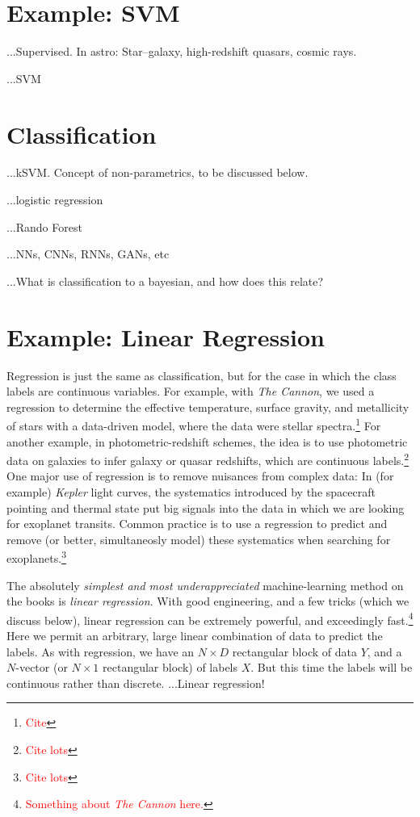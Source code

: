 \documentclass[12pt, twoside, letterpaper]{article}
\newcommand{\project}[1]{\textsl{#1}}
\newcommand{\todo}[1]{\textcolor{red}{#1}}  %
\begin{document}
\section{Example: SVM}

...Supervised. In astro: Star--galaxy, high-redshift quasars, cosmic rays.

...SVM

\section{Classification}

...kSVM. Concept of non-parametrics, to be discussed below.

...logistic regression

...Rando Forest

...NNs, CNNs, RNNs, GANs, etc

...What is classification to a bayesian, and how does this relate?

\section{Example: Linear Regression}

Regression is just the same as classification, but for the case
in which the class labels are continuous variables.
For example, with \project{The Cannon}, we used a regression
to determine the effective temperature, surface gravity, and
metallicity of stars with a data-driven model, where the data
were stellar spectra.\footnote{\todo{Cite}}
For another example, in photometric-redshift schemes, the idea
is to use photometric data on galaxies to infer galaxy or
quasar redshifts,
which are continuous labels.\footnote{\todo{Cite lots}}
One major use of regression is to remove nuisances from complex
data:
In (for example) \project{Kepler} light curves, the systematics
introduced by the spacecraft pointing and thermal state put
big signals into the data in which we are looking for exoplanet
transits.
Common practice is to use a regression to predict and remove
(or better, simultaneosly model) these systematics when searching
for exoplanets.\footnote{\todo{Cite lots}}

The absolutely \emph{simplest and most underappreciated} machine-learning
method on the books is \emph{linear regression}.
With good engineering, and a few tricks (which we discuss below), linear
regression can be extremely powerful, and exceedingly fast.\footnote{%
  \todo{Something about \project{The Cannon} here.}}
Here we permit an arbitrary, large linear combination of data to predict
the labels.
As with regression, we have an $N\times D$ rectangular block of data $Y$,
and a $N$-vector (or $N\times 1$ rectangular block) of labels $X$.
But this time the labels will be continuous rather than discrete.
...Linear regression!
\end{document}
